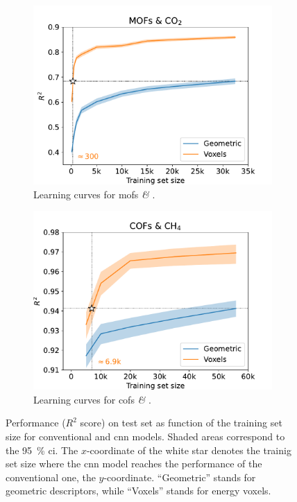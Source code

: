 \begin{figure}
	\centering
	\begin{subfigure}[b]{0.49\textwidth}
		\includegraphics[width=\textwidth]{fig/learning_curves_mofs.pdf}
		\caption{Learning curves for \glspl{mof} \textit{\&} .}
		\label{fig:learning_curves_mofs}
	\end{subfigure}
	\begin{subfigure}[b]{0.49\textwidth}
		\includegraphics[width=\textwidth]{fig/learning_curves_cofs.pdf}
		\caption{Learning curves for \glspl{cof} \textit{\&} .}
		\label{fig:learning_curves_cofs}
	\end{subfigure}
	\caption[Learning curves.]{Performance ($R^2$ score) on test set as function
	of the training set size for conventional and \gls{cnn} models. Shaded areas
	correspond to the \SI{95}{\percent} \gls{ci}. The
	$x$-coordinate of the white star denotes the trainig set size where the
	\gls{cnn} model reaches the performance of the conventional one, the
	$y$-coordinate. ``Geometric'' stands for geometric descriptors, while
	``Voxels'' stands for energy voxels.}
	\label{fig:learning_curves_results}
\end{figure}

